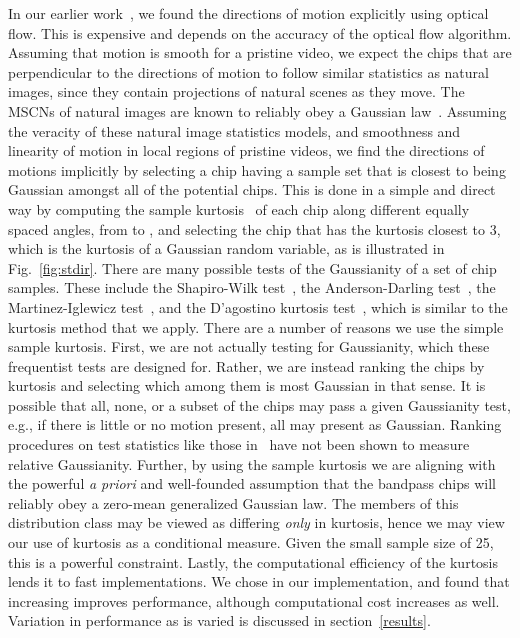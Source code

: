 \documentclass[journal]{IEEEtran}
\begin{document}
In our earlier work~\cite{chipqa0}, we found the directions of motion explicitly using optical flow. This is expensive and depends on the accuracy of the optical flow algorithm. Assuming that motion is smooth for a pristine video, we expect the chips that are perpendicular to the directions of motion to follow similar statistics as natural images, since they contain projections of natural scenes as they move. The MSCNs of natural images are known to reliably obey a Gaussian law~\cite{vbliinds,brisque,niqe,simoncelli,ruderman}. Assuming the veracity of these natural image statistics models, and smoothness and linearity of motion in local regions of pristine videos, we find the directions of motions implicitly by selecting a chip having a sample set that is closest to being Gaussian amongst all of the potential chips.  This is done in a simple and direct way by computing the sample kurtosis~\cite{stats} of each chip along  different equally spaced angles, from  to , and selecting the chip that has the kurtosis closest to 3, which is the kurtosis of a Gaussian random variable, as is illustrated in Fig.~\ref{fig:stdir}. There are many possible tests of the Gaussianity of a set of chip samples. These include the Shapiro-Wilk test~\cite{shapiro}, the Anderson-Darling test~\cite{anderson}, the Martinez-Iglewicz test~\cite{martinez}, and the D'agostino kurtosis test~\cite{agostino}, which is similar to the kurtosis method that we apply. There are a number of reasons we use the simple sample kurtosis. First, we are not actually testing for Gaussianity, which these frequentist tests are designed for. Rather, we are instead ranking the chips by kurtosis and selecting which among them is most Gaussian in that sense. It is possible that all, none, or a subset of the chips may pass a given Gaussianity test, e.g., if there is little or no motion present, all may present as Gaussian. Ranking procedures on test statistics like those in~\cite{shapiro,anderson,martinez,agostino} have not been shown to measure relative Gaussianity. Further, by using the sample kurtosis we are aligning with the powerful \textit{a priori} and well-founded assumption that the bandpass chips will reliably obey a zero-mean generalized Gaussian law. The members of this distribution class may be viewed as differing \textit{only} in kurtosis, hence we may view our use of kurtosis as a conditional measure. Given the small sample size of 25, this is a powerful constraint. Lastly, the computational efficiency of the kurtosis lends it to fast implementations. We chose  in our implementation, and found that increasing  improves performance, although computational cost increases as well. Variation in performance as  is varied is discussed in section~\ref{results}. 
\end{document}

